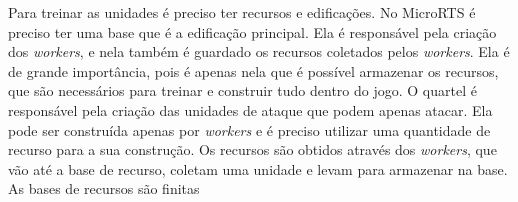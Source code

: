 Para treinar as unidades é preciso ter recursos e edificações. No MicroRTS é preciso ter uma base que é a edificação principal. Ela é responsável pela criação dos \textit{workers}, e nela também é guardado os recursos coletados pelos \textit{workers}. Ela é de grande importância, pois é apenas nela que é possível armazenar os recursos, que são necessários para treinar e construir tudo dentro do jogo. O quartel é responsável pela criação das unidades de ataque que podem apenas atacar. Ela pode ser construída apenas por \textit{workers} e é preciso utilizar uma quantidade de recurso para a sua construção. Os recursos são obtidos através dos \textit{workers}, que vão até a base de recurso, coletam uma unidade e levam para armazenar na base. As bases de recursos são finitas

